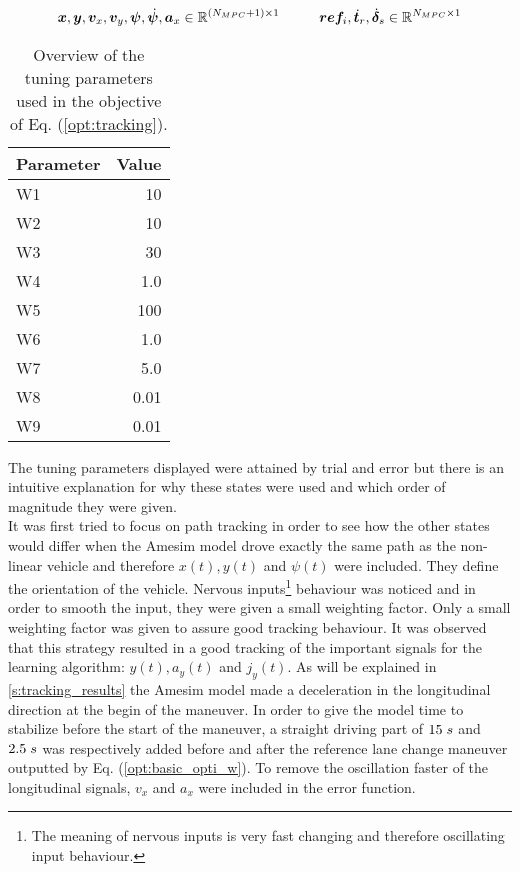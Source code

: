 \[\bm{x},\bm{y},\bm{v}_x,\bm{v}_y,\bm{\psi},\dot{\bm{\psi}},\bm{a}_x \in \mathbb{R}^{(N_{MPC}+1)\times1} \hspace{10mm}\bm{ref}_{i},\dot{\bm{t}}_r,\dot{\bm{\delta}}_s \in \mathbb{R}^{N_{MPC}\times1}\]


\begin{table}[h!]
	\centering
	\begin{tabular}{@{}lr@{}} 
		Parameter    & Value\\ \midrule
		W1      & 10\\
		W2          & 10\\
		W3 	   & 30\\
		W4       & 1.0\\
		W5       & 100\\
		W6       & 1.0\\
		W7       & 5.0\\
		W8       & 0.01\\
		W9  & 0.01\\ \bottomrule
	\end{tabular}
	\caption{Overview of the tuning parameters used in the objective of Eq. (\ref{opt:tracking}).}
	\label{tab:weights}
\end{table}
\newpage
The tuning parameters displayed were attained by trial and error but there is an intuitive explanation for why these states were used and which order of magnitude they were given.\\

It was first tried to focus on path tracking in order to see how the other states would differ when the Amesim model drove exactly the same path as the non-linear vehicle and therefore $x(t),y(t)$ and $\psi(t)$ were included. They define the orientation of the vehicle. Nervous inputs\footnote{The meaning of nervous inputs is very fast changing and therefore oscillating input behaviour.} behaviour was noticed and in order to smooth the input, they were given a small weighting factor. Only a small weighting factor was given to assure good tracking behaviour. It was observed that this strategy resulted in a good tracking of the important signals for the learning algorithm: $y(t), a_y(t)$ and $j_y(t)$. As will be explained in \ref{s:tracking_results} the Amesim model made a deceleration in the longitudinal direction at the begin of the maneuver. In order to  give the model time to stabilize before the start of the maneuver, a straight driving part of $15\hspace{1mm}s$ and $2.5\hspace{1mm}s$ was respectively added before and after the reference lane change maneuver outputted by Eq. (\ref{opt:basic_opti_w}). To remove the oscillation faster of the longitudinal signals, $v_x$ and $a_x$ were included in the error function.\\


